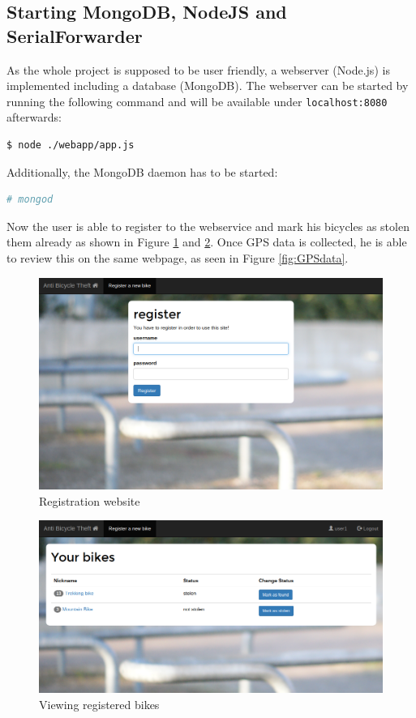 \documentclass[a4paper]{article}
\begin{document}
\subsection{Starting MongoDB, NodeJS and SerialForwarder}
As the whole project is supposed to be user friendly, a webserver (Node.js) is implemented including a database (MongoDB).
The webserver can be started by running the following command and will be available under \texttt{localhost:8080} afterwards:
\begin{lstlisting}[frame=single,language=bash]
$ node ./webapp/app.js
\end{lstlisting}
Additionally, the MongoDB daemon has to be started:
\begin{lstlisting}[frame=single,language=bash]
# mongod
\end{lstlisting}
Now the user is able to register to the webservice and mark his bicycles as stolen them already as shown in Figure \ref{fig:webregistration} and \ref{fig:mark}. Once GPS data is collected, he is able to review this on the same webpage, as seen in Figure \ref{fig:GPSdata}.
\begin{figure}[h!]
\begin{center}
\includegraphics[scale=0.3]{pics/reg.png}
\end{center}
\caption{Registration website}
\label{fig:webregistration}
\end{figure}
\begin{figure}
\begin{center}
\includegraphics[scale=0.3]{pics/mark.png}
\end{center}
\caption{Viewing registered bikes}
\label{fig:mark}
\end{figure}
\end{document}
